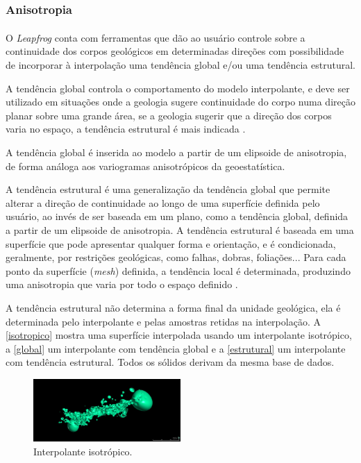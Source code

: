 \subsubsection{Anisotropia}

O \textit{Leapfrog}\textsuperscript{\textregistered} conta com ferramentas que dão ao usuário controle sobre a continuidade dos corpos geológicos em determinadas direções com possibilidade de incorporar à interpolação uma tendência global e/ou uma tendência estrutural.

A tendência global controla o comportamento do modelo interpolante, e deve ser utilizado em situações onde a geologia sugere continuidade do corpo numa direção planar sobre uma grande área, se a geologia sugerir que a direção dos corpos varia no espaço, a tendência estrutural é mais indicada \cite{leapfroganisglobal}.

A tendência global é inserida ao modelo a partir de um elipsoide de anisotropia, de forma análoga aos variogramas anisotrópicos da geoestatística.

A tendência estrutural é uma generalização da tendência global que permite alterar a direção de continuidade ao longo de uma superfície definida pelo usuário, ao invés de ser baseada em um plano, como a tendência global, definida a partir de um elipsoide de anisotropia. A tendência estrutural é baseada em uma superfície que pode apresentar qualquer forma e orientação, e é condicionada, geralmente, por restrições geológicas, como falhas, dobras, foliações... Para cada ponto da superfície (\textit{mesh}) definida, a tendência local é determinada, produzindo uma anisotropia que varia por todo o espaço definido \cite{leapfrogstructural}.

A tendência estrutural não determina a forma final da unidade geológica, ela é determinada pelo interpolante e pelas amostras retidas na interpolação. A \autoref{isotropico} mostra uma superfície interpolada usando um interpolante isotrópico, a \autoref{global} um interpolante com tendência global e a \autoref{estrutural} um interpolante com tendência estrutural. Todos os sólidos derivam da mesma base de dados.

\begin{figure}[!htb]
	\caption{\label{isotropico}Interpolante isotrópico.}
	\begin{center}
		\includegraphics[width=0.5\textwidth]{revisao_bibliografica/isotropic_interpolant}
	\end{center}
\end{figure}

